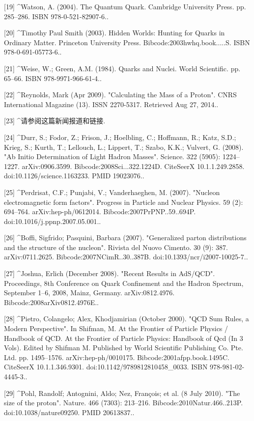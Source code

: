 [19]
^Watson, A. (2004). The Quantum Quark. Cambridge University Press. pp. 285–286. ISBN 978-0-521-82907-6..

[20]
^Timothy Paul Smith (2003). Hidden Worlds: Hunting for Quarks in Ordinary Matter. Princeton University Press. Bibcode:2003hwhq.book.....S. ISBN 978-0-691-05773-6..

[21]
^Weise, W.; Green, A.M. (1984). Quarks and Nuclei. World Scientific. pp. 65–66. ISBN 978-9971-966-61-4..

[22]
^Reynolds, Mark (Apr 2009). "Calculating the Mass of a Proton". CNRS International Magazine (13). ISSN 2270-5317. Retrieved Aug 27, 2014..

[23]
^请参阅这篇新闻报道和链接.

[24]
^Durr, S.; Fodor, Z.; Frison, J.; Hoelbling, C.; Hoffmann, R.; Katz, S.D.; Krieg, S.; Kurth, T.; Lellouch, L.; Lippert, T.; Szabo, K.K.; Vulvert, G. (2008). "Ab Initio Determination of Light Hadron Masses". Science. 322 (5905): 1224–1227. arXiv:0906.3599. Bibcode:2008Sci...322.1224D. CiteSeerX 10.1.1.249.2858. doi:10.1126/science.1163233. PMID 19023076..

[25]
^Perdrisat, C.F.; Punjabi, V.; Vanderhaeghen, M. (2007). "Nucleon electromagnetic form factors". Progress in Particle and Nuclear Physics. 59 (2): 694–764. arXiv:hep-ph/0612014. Bibcode:2007PrPNP..59..694P. doi:10.1016/j.ppnp.2007.05.001..

[26]
^Boffi, Sigfrido; Pasquini, Barbara (2007). "Generalized parton distributions and the structure of the nucleon". Rivista del Nuovo Cimento. 30 (9): 387. arXiv:0711.2625. Bibcode:2007NCimR..30..387B. doi:10.1393/ncr/i2007-10025-7..

[27]
^Joshua, Erlich (December 2008). "Recent Results in AdS/QCD". Proceedings, 8th Conference on Quark Confinement and the Hadron Spectrum, September 1–6, 2008, Mainz, Germany. arXiv:0812.4976. Bibcode:2008arXiv0812.4976E..

[28]
^Pietro, Colangelo; Alex, Khodjamirian (October 2000). "QCD Sum Rules, a Modern Perspective". In Shifman, M. At the Frontier of Particle Physics / Handbook of QCD. At the Frontier of Particle Physics: Handbook of Qcd (In 3 Vols). Edited by Shifman M. Published by World Scientific Publishing Co. Pte. Ltd. pp. 1495–1576. arXiv:hep-ph/0010175. Bibcode:2001afpp.book.1495C. CiteSeerX 10.1.1.346.9301. doi:10.1142/9789812810458_0033. ISBN 978-981-02-4445-3..

[29]
^Pohl, Randolf; Antognini, Aldo; Nez, François; et al. (8 July 2010). "The size of the proton". Nature. 466 (7303): 213–216. Bibcode:2010Natur.466..213P. doi:10.1038/nature09250. PMID 20613837..

